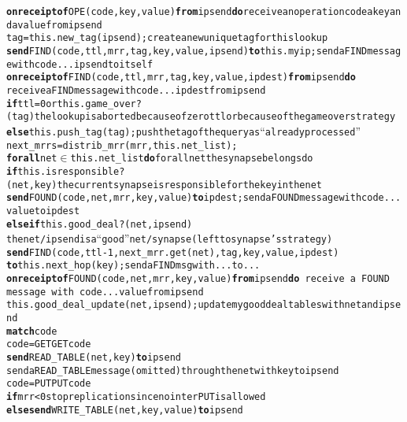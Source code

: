 \begin{figure*}[!t]
{\scriptsize
\begin{alltt}
\AL \textbf{on receipt of} OPE(code,key,value) \textbf{from} ipsend \textbf{do} \hfill{\rm receive an operation code a key and a value from ipsend}
\AL  tag = this.new_tag(ipsend);\hfill{\rm create a new unique tag for this lookup}
\AL  \textbf{send} FIND(code,ttl,mrr,tag,key,value,ipsend) \textbf{to} this.myip;\hfill{\rm send a FIND message with code ... ipsend to itself}
\NA
\AL \textbf{on receipt of} FIND(code,ttl,mrr,tag,key,value,ipdest)\textbf{from} ipsend \textbf{do}
\hfill{\rm receive a FIND message with code ... ipdest from ipsend}
\AL   \textbf{if} ttl = 0 or this.game_over?(tag)\hfill{\rm the lookup is aborted because of zero ttl or because of the game over strategy}
\AL   \textbf{else} this.push_tag(tag); \hfill{\rm push the tag of the query as ``already processed''}
\AL     next_mrrs = distrib_mrr(mrr,this.net_list);
\AL     \textbf{for all} net\( \in \)this.net_list \textbf{do}\hfill{\rm for all net the synapse belongs do}
\AL       \textbf{if} this.isresponsible?(net,key) \hfill{\rm the current synapse is responsible for the key in the net}
\AL         \textbf{send} FOUND(code,net,mrr,key,value) \textbf{to} ipdest; \hfill{\rm send a FOUND message with code ... value to ipdest}
\AL       \textbf{else if} this.good_deal?(net,ipsend)
\hfill{\rm the net/ipsend is a  ``good'' net/synapse  (left to synapse's strategy)}
\AL              \textbf{send} FIND(code,ttl-1,next_mrr.get(net),tag,key,value,ipdest) 
                    \textbf{to} this.next_hop(key);\hfill{\rm send a FIND msg with ... to ...}
\NA
\AL \textbf{on receipt of} FOUND(code,net,mrr,key,value) \textbf{from} ipsend\textbf{do}\hfill{\rm\,receive\,a\,FOUND\,message\,with\,code ... value from ipsend}
\AL   this.good_deal_update(net,ipsend);\hfill{\rm update my good deal tables with net and ipsend}
\AL   \textbf{match} code
\AL    code=GET  \hfill{\rm GET code}
\AL     \textbf{send} READ_TABLE(net,key) \textbf{to} ipsend 
\hfill{\rm send a READ\_TABLE message (omitted) through the net with key to ipsend}
\AL    code=PUT \hfill{\rm PUT code}
\AL     \textbf{if} mrr < 0 \hfill{\rm stop replication since no inter PUT is allowed}
\AL     \textbf{else} \textbf{send} WRITE_TABLE(net,key,value) \textbf{to} ipsend 

\end{alltt}}
\end{figure*}
